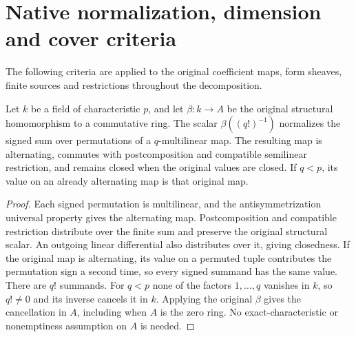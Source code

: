 \section{Native normalization, dimension and cover criteria}
\label{sec:di-reused-native-decomposition-criteria}

The following criteria are applied to the original coefficient maps,
form sheaves, finite sources and restrictions throughout the decomposition.

\begin{lemma}
\label{lem:di-reused-native-normalization}
\leanok
Let $k$ be a field of characteristic $p$, and let $\beta:k\to A$ be
the original structural homomorphism to a commutative ring. The scalar
$\beta((q!)^{-1})$ normalizes the signed sum over permutations of a
$q$-multilinear map. The resulting map is alternating, commutes with
postcomposition and compatible semilinear restriction, and remains
closed when the original values are closed. If $q<p$, its value on an
already alternating map is that original map.
\end{lemma}
\begin{proof}
\leanok
Each signed permutation is multilinear, and the antisymmetrization
universal property gives the alternating map. Postcomposition and
compatible restriction distribute over the finite sum and preserve
the original structural scalar. An outgoing linear differential also
distributes over it, giving closedness. If the original map is
alternating, its value on a permuted tuple contributes the permutation
sign a second time, so every signed summand has the same value. There
are $q!$ summands. For $q<p$ none of the factors $1,\ldots,q$ vanishes
in $k$, so $q!\ne0$ and its inverse cancels it in $k$. Applying the
original $\beta$ gives the cancellation in $A$, including when $A$ is
the zero ring. No exact-characteristic or nonemptiness assumption on
$A$ is needed.
\end{proof}

